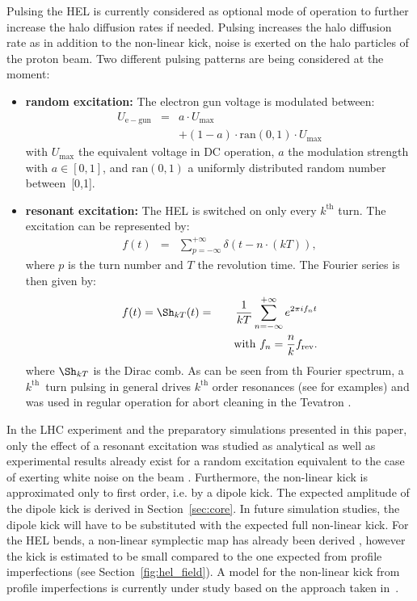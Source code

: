 \documentclass[%
 reprint,
 amsmath,amssymb,
 aps,
prstab,
]{revtex4-1}
\begin{document}
Pulsing the HEL is currently considered as optional mode of operation to further increase the halo diffusion rates if needed. Pulsing increases the halo diffusion rate as in addition to the non-linear kick, noise is exerted on the halo particles of the proton beam. Two different pulsing patterns are being considered at the moment:
\begin{itemize}
	\item \textbf{random excitation:} The electron gun voltage is modulated between:
	\begin{eqnarray}
		U_{\mathrm{e-gun}}&=&a\cdot U_{\mathrm{max}}\\
		& &+(1-a)\cdot \mathrm{ran}(0,1)\cdot U_{\mathrm{max}}
	\end{eqnarray}
	with $U_{\mathrm{max}}$ the equivalent voltage in DC operation, $a$ the modulation strength with $a\in[0,1]$, and $\mathrm{ran}(0,1)$ a uniformly distributed random number between~[0,1].
	\item \textbf{resonant excitation:} The HEL is switched on only every $k^{\mathrm{th}}$ turn. The excitation can be represented by:
	\begin{eqnarray}\label{intro:eqn:1}
	f(t)&=&\sum_{p=-\infty}^{+\infty}\delta(t-n\cdot(kT)),
	\end{eqnarray}
	where $p$ is the turn number and $T$ the revolution time. The Fourier series is then given by:
	\begin{eqnarray}\label{intro:eqn:2}
	f(t)=\Sh_{kT}(t)
	&=&\frac{1}{kT}\sum_{n=-\infty}^{+\infty}e^{2\pi i f_nt} \\
	& & \quad \text{with} \ f_n=\frac{n}{k}f_{\rm rev}.
	\end{eqnarray}
	where $\Sh_{kT}$ is the Dirac comb. As can be seen from th Fourier spectrum, a $k^{\mathrm{th}}$~turn pulsing in general drives $k^{\mathrm{th}}$ order resonances (see \cite{md_sim_hel_res_ex_fitterer} for examples) and was used in regular operation for abort cleaning in the Tevatron \cite{hel_tevatron_abortgap_zhang}.
\end{itemize}
In the LHC experiment and the preparatory simulations presented in this paper, only the effect of a resonant excitation was studied as analytical as well as experimental results already exist for a random excitation equivalent to the case of exerting white noise on the beam \cite{noise_2007_ohmi,noise_alexahin_lhc,noise_lebedev_ssc,noise_2014_ohmi,md1433_noise_top_energy,md400_noise_injection}. Furthermore, the non-linear kick is approximated only to first order, i.e. by a dipole kick. The expected amplitude of the dipole kick is derived in Section~\ref{sec:core}. In future simulation studies, the dipole kick will have to be substituted with the expected full non-linear kick. For the HEL bends, a non-linear symplectic map has already been derived \cite{hel_bends_stancari}, however the kick is estimated to be small compared to the one expected from profile imperfections (see Section~\ref{fig:hel_field}). A model for the non-linear kick from profile imperfections is currently under study based on the approach taken in~\cite{hel_model_polynomial_morozov}.
\end{document}
